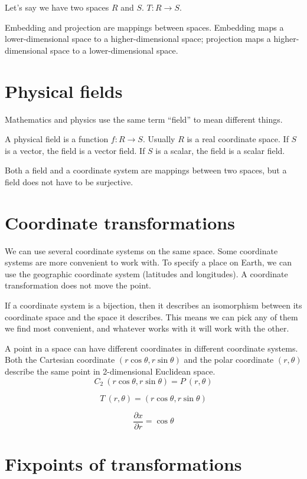 Let's say we have two spaces $R$ and $S$.
$T : R \to S$.

Embedding and projection are mappings between spaces.
Embedding maps a lower-dimensional space to a higher-dimensional space;
projection maps a higher-dimensional space to a lower-dimensional space.

\section{Physical fields}

Mathematics and physics use the same term ``field'' to mean different things.

A physical field is a function $f : R \to S$.
Usually $R$ is a real coordinate space.
If $S$ is a vector, the field is a vector field.
If $S$ is a scalar, the field is a scalar field.

Both a field and a coordinate system are mappings between two spaces,
but a field does not have to be surjective.

\section{Coordinate transformations}

We can use several coordinate systems on the same space.
Some coordinate systems are more convenient to work with.
To specify a place on Earth, we can use the
geographic coordinate system (latitudes and longitudes).
A coordinate transformation does not move the point.

If a coordinate system is a bijection,
then it describes an isomorphism between
its coordinate space and the space it describes.
This means we can pick any of them we find most convenient,
and whatever works with it will work with the other.

A point in a space can have different coordinates in different coordinate systems.
Both the Cartesian coordinate $(r\cos\theta, r\sin\theta)$ and the polar coordinate $(r,\theta)$
describe the same point in 2-dimensional Euclidean space.
\[
C_2~(r\cos\theta, r\sin\theta) = P~(r,\theta)
\]

\[
T~(r,\theta) = (r \cos \theta, r \sin \theta)
\]

\[
\frac{\partial x}{\partial r} = \cos \theta
\]

\section{Fixpoints of transformations}


